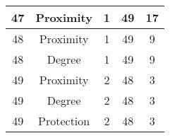 \documentclass[results.tex]{subfiles}
\begin{document}
\begin{center}
\begin{tabular}{| c || c | c | c | c |}
            \hline
            47                      & Proximity                    & 1                      & 49                      & 17                   \\
            \hline
            48                      & Proximity                    & 1                      & 49                      & 9                    \\
            \hline
            48                      & Degree                       & 1                      & 49                      & 9                    \\
            \hline
            49                      & Proximity                    & 2                      & 48                      & 3                    \\
            \hline
            49                      & Degree                       & 2                      & 48                      & 3                    \\
            \hline
            49                      & Protection                   & 2                      & 48                      & 3                    \\
            \hline
        \end{tabular}
    \end{center}
\end{document}
